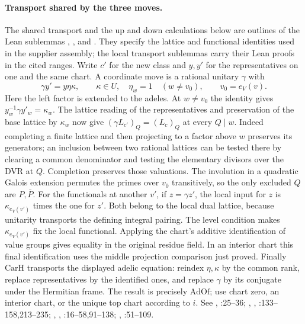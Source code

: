 \paragraph{Transport shared by the three moves.}
The shared transport and the up and down calculations below are
outlines of the Lean sublemmas ,
,  and . They specify
the lattice and functional identities used in the supplier assembly;
the local transport sublemmas carry their Lean proofs in the cited
ranges.
Write $c'$ for the new class and $y,y'$ for the representatives on
one and the same chart. A coordinate move is a rational unitary
$\gamma$ with
\[
   \gamma y'=y\eta\kappa,\qquad \kappa\in U,\quad \eta_w=1
                      \quad(w\ne v_0),\qquad v_0=e_V(v).
\]
Here the left factor is extended to the adeles. At $w\ne v_0$ the
identity gives $y_w^{-1}\gamma y'_w=\kappa_w$. The lattice reading
of the representatives and preservation of the base lattice by
$\kappa_w$ now give $(\gamma L_{c'})_Q=(L_c)_Q$ at every $Q\mid w$.
Indeed completing a finite lattice and then projecting to a factor above
$w$ preserves its generators; an inclusion between two rational
lattices can be tested there by clearing a common denominator and
testing the elementary divisors over the DVR at $Q$. Completion preserves
those valuations. The involution in a quadratic Galois extension
permutes the primes over $v_0$ transitively, so the only excluded
$Q$ are $P,\bar P$. For the functionals at another $v'$, if
$z=\gamma z'$, the local input for $z$ is $\kappa_{e_V(v')}$
times the one for $z'$. Both belong to the local dual lattice, because
unitarity transports the defining integral pairing. The level condition
makes $\kappa_{e_V(v')}$ fix the local functional. Applying the chart's
additive identification of value groups gives equality in the original
residue field. In an interior chart this final identification uses the
middle projection comparison just proved. Finally $\mathrm{CarH}$
transports the displayed adelic equation: reindex $\eta,\kappa$ by
the common rank, replace representatives by the identified ones, and
replace $\gamma$ by its conjugate under the Hermitian frame. The result
is precisely $\mathrm{AdOf}$; use chart zero, an interior chart, or
the unique top chart according to $i$.
See , :25--36;
, ,
:133--158,213--235;
, ,
:16--58,91--138;
, :51--109.

